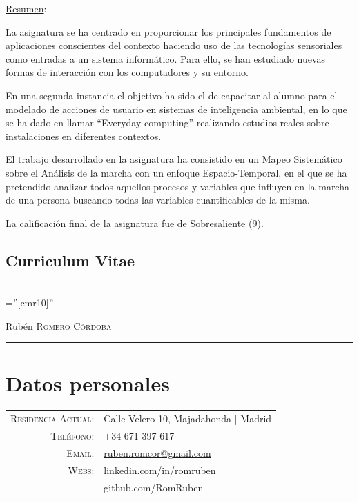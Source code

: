 \documentclass[runningheads,a4paper]{llncs}
\theoremstyle{break}
\begin{document}
\vspace{-3.5em}
\textbf{}

\underline{Resumen}:

La asignatura se ha centrado en proporcionar los principales fundamentos de aplicaciones conscientes del contexto haciendo uso de las tecnologías sensoriales como entradas a un sistema informático. Para ello, se han estudiado nuevas formas de interacción con los computadores y su entorno.

En una segunda instancia el objetivo ha sido el de capacitar al alumno para el modelado de acciones de usuario en sistemas de inteligencia ambiental, en lo que se ha dado en llamar ``Everyday computing'' realizando estudios reales sobre instalaciones en diferentes contextos.

El trabajo desarrollado en la asignatura ha consistido en un Mapeo Sistemático sobre el Análisis de la marcha con un enfoque Espacio-Temporal, en el que se ha pretendido analizar todos aquellos procesos y variables que influyen en la marcha de una persona buscando todas las variables cuantificables de la misma.

La calificación final de la asignatura fue de Sobresaliente (9).



\pagebreak

\subsection{Curriculum Vitae}
\textbf{}\\

\font\fb=''[cmr10]'' %

\par{\centering
		{\Huge Rubén \textsc{Romero Córdoba}
	}\bigskip\par}
\hrule

\section*{Datos personales}

\begin{tabular}{rl}
    \textsc{Residencia Actual:} & Calle Velero 10, Majadahonda  | Madrid \\
    \textsc{Teléfono:}     & +34 671 397 617\\
    \textsc{Email:}     & \href{mailto:ruben.romcor@gmail.com}{ruben.romcor@gmail.com}\\
    \textsc{Webs:} & linkedin.com/in/romruben\\
				   & github.com/RomRuben\\
\end{tabular}
\end{document}
